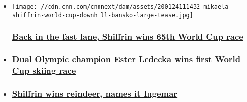 \begin{itemize}
\item
  \href{/2020/01/24/sport/mikaela-shiffrin-world-cup-skiing-bansko-downhill-spt-intl/index.html}{}

  \texttt{[image: //cdn.cnn.com/cnnnext/dam/assets/200124111432-mikaela-shiffrin-world-cup-downhill-bansko-large-tease.jpg]}

  \hypertarget{back-in-the-fast-lane-shiffrin-wins-65th-world-cup-race}{%
  \subsubsection{\texorpdfstring{\href{/2020/01/24/sport/mikaela-shiffrin-world-cup-skiing-bansko-downhill-spt-intl/index.html}{Back
  in the fast lane, Shiffrin wins 65th World Cup
  race}}{Back in the fast lane, Shiffrin wins 65th World Cup race}}\label{back-in-the-fast-lane-shiffrin-wins-65th-world-cup-race}}
\item
  \hypertarget{dual-olympic-champion-ester-ledecka-wins-first-world-cup-skiing-race}{%
  \subsubsection{\texorpdfstring{\href{/2019/12/07/sport/ester-ledecka-world-cup-downhill-lake-louise-spt-intl/index.html}{Dual
  Olympic champion Ester Ledecka wins first World Cup skiing
  race}}{Dual Olympic champion Ester Ledecka wins first World Cup skiing race}}\label{dual-olympic-champion-ester-ledecka-wins-first-world-cup-skiing-race}}
\item
  \hypertarget{shiffrin-wins-reindeer-names-it-ingemar}{%
  \subsubsection{\texorpdfstring{\href{/2019/11/25/sport/mikaela-shiffrin-skiing-slalom-reindeer-world-cup-record-ingemar-stenmark-finland-spt-intl/index.html}{Shiffrin
  wins reindeer, names it
  Ingemar}}{Shiffrin wins reindeer, names it Ingemar}}\label{shiffrin-wins-reindeer-names-it-ingemar}}
\end{itemize}

